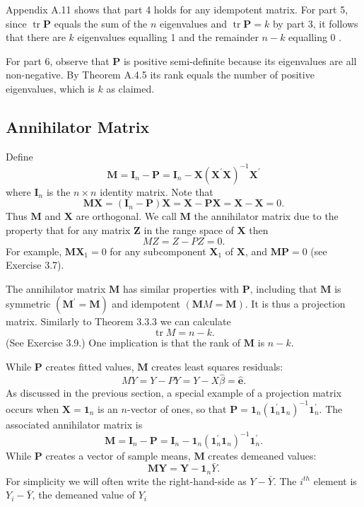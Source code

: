 \documentclass[10pt]{article}
\begin{document}
Appendix A.11 shows that part 4 holds for any idempotent matrix. For part 5, since $\operatorname{tr} \boldsymbol{P}$ equals the sum of the $n$ eigenvalues and $\operatorname{tr} \boldsymbol{P}=k$ by part 3, it follows that there are $k$ eigenvalues equalling 1 and the remainder $n-k$ equalling 0 .

For part 6, observe that $\boldsymbol{P}$ is positive semi-definite because its eigenvalues are all non-negative. By Theorem A.4.5 its rank equals the number of positive eigenvalues, which is $k$ as claimed.

\subsection{Annihilator Matrix}
Define
$$
\boldsymbol{M}=\boldsymbol{I}_{n}-\boldsymbol{P}=\boldsymbol{I}_{n}-\boldsymbol{X}\left(\boldsymbol{X}^{\prime} \boldsymbol{X}\right)^{-1} \boldsymbol{X}^{\prime}
$$
where $\boldsymbol{I}_{n}$ is the $n \times n$ identity matrix. Note that
$$
\boldsymbol{M} \boldsymbol{X}=\left(\boldsymbol{I}_{n}-\boldsymbol{P}\right) \boldsymbol{X}=\boldsymbol{X}-\boldsymbol{P} \boldsymbol{X}=\boldsymbol{X}-\boldsymbol{X}=0 .
$$
Thus $\boldsymbol{M}$ and $\boldsymbol{X}$ are orthogonal. We call $\boldsymbol{M}$ the annihilator matrix due to the property that for any matrix $\boldsymbol{Z}$ in the range space of $\boldsymbol{X}$ then
$$
M Z=Z-P Z=0 .
$$
For example, $\boldsymbol{M} \boldsymbol{X}_{1}=0$ for any subcomponent $\boldsymbol{X}_{1}$ of $\boldsymbol{X}$, and $\boldsymbol{M P}=0$ (see Exercise 3.7).

The annihilator matrix $\boldsymbol{M}$ has similar properties with $\boldsymbol{P}$, including that $\boldsymbol{M}$ is symmetric $\left(\boldsymbol{M}^{\prime}=\boldsymbol{M}\right)$ and idempotent $(\boldsymbol{M} M=\boldsymbol{M})$. It is thus a projection matrix. Similarly to Theorem 3.3.3 we can calculate
$$
\operatorname{tr} M=n-k .
$$
(See Exercise 3.9.) One implication is that the rank of $\boldsymbol{M}$ is $n-k$.

While $\boldsymbol{P}$ creates fitted values, $\boldsymbol{M}$ creates least squares residuals:
$$
M Y=Y-P Y=Y-X \widehat{\beta}=\widehat{\boldsymbol{e}} .
$$
As discussed in the previous section, a special example of a projection matrix occurs when $\boldsymbol{X}=\mathbf{1}_{n}$ is an $n$-vector of ones, so that $\boldsymbol{P}=\mathbf{1}_{n}\left(\mathbf{1}_{n}^{\prime} \mathbf{1}_{n}\right)^{-1} \mathbf{1}_{n}^{\prime}$. The associated annihilator matrix is
$$
\boldsymbol{M}=\boldsymbol{I}_{n}-\boldsymbol{P}=\boldsymbol{I}_{n}-\mathbf{1}_{n}\left(\mathbf{1}_{n}^{\prime} \mathbf{1}_{n}\right)^{-1} \mathbf{1}_{n}^{\prime} .
$$
While $\boldsymbol{P}$ creates a vector of sample means, $\boldsymbol{M}$ creates demeaned values:
$$
\boldsymbol{M Y}=\boldsymbol{Y}-\mathbf{1}_{n} \bar{Y} .
$$
For simplicity we will often write the right-hand-side as $Y-\bar{Y}$. The $i^{t h}$ element is $Y_{i}-\bar{Y}$, the demeaned value of $Y_{i}$
\end{document}
